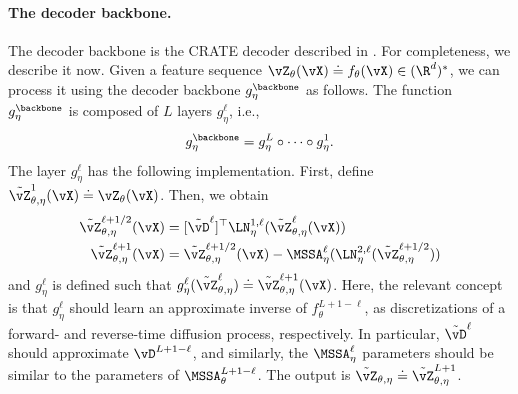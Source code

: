 \documentclass[../../book-main.tex]{subfiles}
\begin{document}
\paragraph{The decoder backbone.} The decoder backbone is the CRATE decoder described in . For completeness, we describe it now. Given a feature sequence \(\vZ_{\theta}(\vX) \doteq f_{\theta}(\vX) \in (\R^{d})^{*}\), we can process it using the decoder backbone \(g_{\eta}^{\backbone}\) as follows. The function \(g_{\eta}^{\backbone}\) is composed of \(L\) layers \(g_{\eta}^{\ell}\), i.e.,
\begin{equation}
    g_{\eta}^{\backbone} = g_{\eta}^{L} \circ \cdots \circ g_{\eta}^{1}.
\end{equation}
The layer \(g_{\eta}^{\ell}\) has the following implementation. First, define \(\tilde{\vZ}_{\theta, \eta}^{1}(\vX) \doteq \vZ_{\theta}(\vX)\). Then, we obtain
\begin{align}
    \tilde{\vZ}_{\theta, \eta}^{\ell + 1/2}(\vX) 
    &= [\tilde{\vD}^{\ell}]^{\top}\LN_{\eta}^{1, \ell}(\tilde{\vZ}_{\theta, \eta}^{\ell}(\vX)) \\ 
    \tilde{\vZ}_{\theta, \eta}^{\ell + 1}(\vX)
    &= \tilde{\vZ}_{\theta, \eta}^{\ell + 1/2}(\vX) - \MSSA_{\eta}^{\ell}(\LN_{\eta}^{2, \ell}(\tilde{\vZ}_{\theta, \eta}^{\ell + 1/2}))
\end{align}
and \(g_{\eta}^{\ell}\) is defined such that \(g_{\eta}^{\ell}(\tilde{\vZ}_{\theta, \eta}^{\ell}) \doteq \tilde{\vZ}_{\theta, \eta}^{\ell + 1}(\vX)\). Here, the relevant concept is that \(g_{\eta}^{\ell}\) should learn an approximate inverse of \(f_{\theta}^{L + 1 - \ell}\), as discretizations of a forward- and reverse-time diffusion process, respectively. In particular, \(\tilde{\vD}^{\ell}\) should approximate \(\vD^{L + 1 - \ell}\), and similarly, the \(\MSSA_{\eta}^{\ell}\) parameters should be similar to the parameters of \(\MSSA_{\theta}^{L + 1 - \ell}\). The output is \(\tilde{\vZ}_{\theta, \eta} \doteq \tilde{\vZ}_{\theta, \eta}^{L + 1}\).
\end{document}
